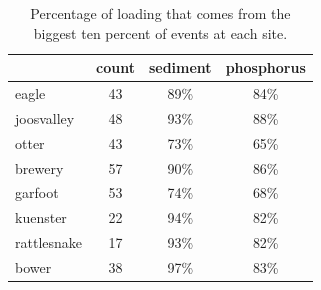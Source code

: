 \documentclass[10pt]{article}
\begin{document}
\begin{table}[ht]
\begin{center}
\begin{tabular}{lccc}
  & count & sediment & phosphorus \\ 
  \hline
eagle & 43 & 89\% & 84\% \\ 
  joosvalley & 48 & 93\% & 88\% \\ 
  otter & 43 & 73\% & 65\% \\ 
  brewery & 57 & 90\% & 86\% \\ 
  garfoot & 53 & 74\% & 68\% \\ 
  kuenster & 22 & 94\% & 82\% \\ 
  rattlesnake & 17 & 93\% & 82\% \\ 
  bower & 38 & 97\% & 83\% \\ 
  \end{tabular}
\caption{Percentage of loading that comes from the biggest ten percent of events at each site.}
\label{tab:majorload}
\end{center}
\end{table}
\end{document}
